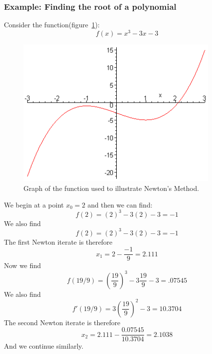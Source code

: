 \documentclass[a4paper, 12pt]{report}
\begin{document}
    \subsubsection{Example: Finding the root of a polynomial }
    Consider the function(figure~\ref{fig:NMI}):
    \begin{equation}
        f(x) = x^{3} - 3x -3
    \end{equation}
    \begin{figure}[h]
    \centering
    \includegraphics[width=10cm]{Newton's Method Image.png}
    \caption{Graph of the function used to illustrate Newton's Method.}
    \label{fig:NMI}
    \end{figure}
    We begin at a point $x_{0}=2$ and then we can find:
    \begin{equation}
        f(2) = (2)^{3} - 3(2)-3 = -1
    \end{equation}
    We also find 
    \begin{equation}
        f(2) = (2)^{3} - 3(2)-3 = -1
    \end{equation}
    The first Newton iterate is therefore
    \begin{equation}
        x_{1}= 2-\frac{-1}{9} = 2.111
    \end{equation}
    Now we find
    \begin{equation}
        f(19/9) = (\frac{19}{9})^{3} - 3\frac{19}{9} - 3 = .07545
    \end{equation}
    We also find
    \begin{equation}
        f'(19/9) = 3(\frac{19}{9})^{2} - 3 = 10.3704
    \end{equation}
    The second Newton iterate is therefore
    \begin{equation}
       x_{2} = 2.111-\frac{0.07545}{10.3704} = 2.1038
    \end{equation}
    And we continue similarly.
    
\end{document}
